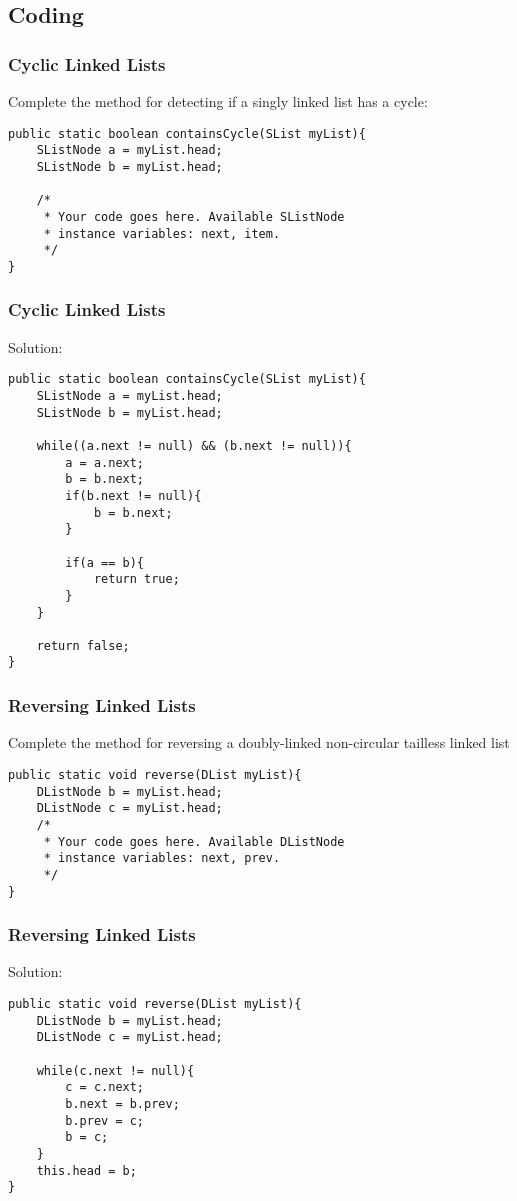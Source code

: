 \documentclass[9pt]{beamer}
\begin{document}
\subsection{Coding}
\begin{frame}[fragile]
  \frametitle{Cyclic Linked Lists}
  Complete the method for detecting if a singly linked list has a cycle:

  \begin{lstlisting}
public static boolean containsCycle(SList myList){
    SListNode a = myList.head;
    SListNode b = myList.head;

    /*
     * Your code goes here. Available SListNode
     * instance variables: next, item.
     */
}
  \end{lstlisting}
\end{frame}

\begin{frame}[fragile]
  \frametitle{Cyclic Linked Lists}
  Solution:

  \begin{lstlisting}
public static boolean containsCycle(SList myList){
    SListNode a = myList.head;
    SListNode b = myList.head;

    while((a.next != null) && (b.next != null)){
        a = a.next;
        b = b.next;
        if(b.next != null){
            b = b.next;
        }

        if(a == b){
            return true;
        }
    }

    return false;
}
  \end{lstlisting}
\end{frame}

\begin{frame}[fragile]
  \frametitle{Reversing Linked Lists}
  Complete the method for reversing a doubly-linked non-circular tailless
  linked list

  \begin{lstlisting}
public static void reverse(DList myList){
    DListNode b = myList.head;
    DListNode c = myList.head;
    /*
     * Your code goes here. Available DListNode
     * instance variables: next, prev.
     */
}
  \end{lstlisting}
\end{frame}

\begin{frame}[fragile]
  \frametitle{Reversing Linked Lists}
  Solution:

  \begin{lstlisting}
public static void reverse(DList myList){
    DListNode b = myList.head;
    DListNode c = myList.head;

    while(c.next != null){
        c = c.next;
        b.next = b.prev;
        b.prev = c;
        b = c;
    }
    this.head = b;
}
  \end{lstlisting}
\end{frame}
\end{document}

